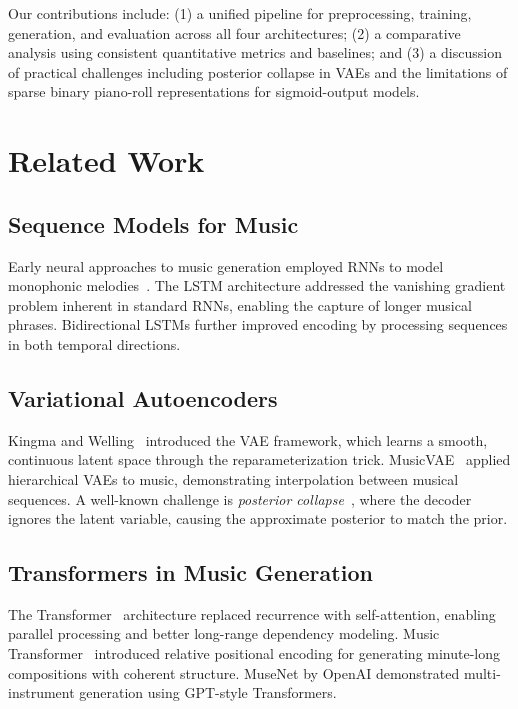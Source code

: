 \documentclass[conference]{IEEEtran}
\begin{document}
Our contributions include: (1) a unified pipeline for preprocessing, training, generation, and evaluation across all four architectures; (2) a comparative analysis using consistent quantitative metrics and baselines; and (3) a discussion of practical challenges including posterior collapse in VAEs and the limitations of sparse binary piano-roll representations for sigmoid-output models.

\section{Related Work}

\subsection{Sequence Models for Music}
Early neural approaches to music generation employed RNNs to model monophonic melodies~\cite{eck2002first}. The LSTM architecture addressed the vanishing gradient problem inherent in standard RNNs, enabling the capture of longer musical phrases. Bidirectional LSTMs further improved encoding by processing sequences in both temporal directions.

\subsection{Variational Autoencoders}
Kingma and Welling~\cite{kingma2014auto} introduced the VAE framework, which learns a smooth, continuous latent space through the reparameterization trick. MusicVAE~\cite{roberts2018hierarchical} applied hierarchical VAEs to music, demonstrating interpolation between musical sequences. A well-known challenge is \textit{posterior collapse}~\cite{bowman2016generating}, where the decoder ignores the latent variable, causing the approximate posterior to match the prior.

\subsection{Transformers in Music Generation}
The Transformer~\cite{vaswani2017attention} architecture replaced recurrence with self-attention, enabling parallel processing and better long-range dependency modeling. Music Transformer~\cite{huang2019music} introduced relative positional encoding for generating minute-long compositions with coherent structure. MuseNet by OpenAI demonstrated multi-instrument generation using GPT-style Transformers.
\end{document}
